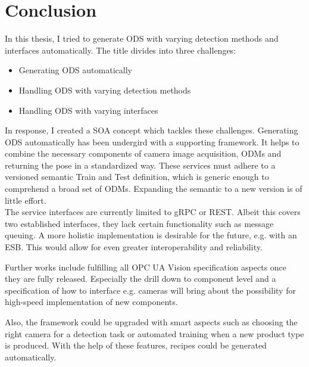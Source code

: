 \chapter{Conclusion\label{cha:chapter7}}

In this thesis, I tried to generate ODS with varying detection methods and interfaces automatically. The title divides into three challenges:
\begin{itemize}
    \item Generating ODS automatically
    \item Handling ODS with varying detection methods
    \item Handling ODS with varying interfaces
\end{itemize}
In response, I created a SOA concept which tackles these challenges. Generating ODS automatically has been undergird with a supporting framework. It helps to combine the necessary components of camera image acquisition, ODMs and returning the pose in a standardized way. These services must adhere to a versioned semantic Train and Test definition, which is generic enough to comprehend a broad set of ODMs. Expanding the semantic to a new version is of little effort.\\
The service interfaces are currently limited to gRPC or REST. Albeit this covers two established interfaces, they lack certain functionality such as message queuing. A more holistic implementation is desirable for the future, e.g. with an ESB. This would allow for even greater interoperability and reliability.

Further works include fulfilling all OPC UA Vision specification aspects once they are fully released. Especially the drill down to component level and a specification of how to interface e.g. cameras will bring about the possibility for high-speed implementation of new components.

Also, the framework could be upgraded with smart aspects such as choosing the right camera for a detection task or automated training when a new product type is produced. With the help of these features, recipes could be generated automatically.

